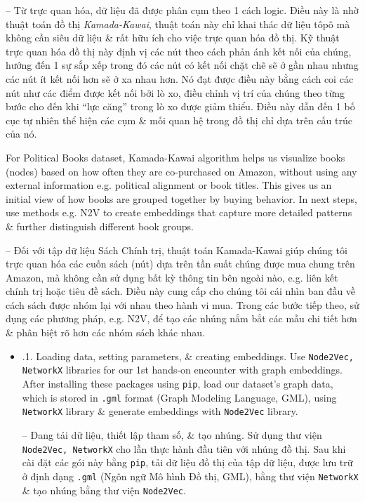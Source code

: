 \documentclass{article}
\begin{document}
\begin{itemize}
\begin{itemize}
        -- Từ trực quan hóa, dữ liệu đã được phân cụm theo 1 cách logic. Điều này là nhờ thuật toán đồ thị {\it Kamada-Kawai}, thuật toán này chỉ khai thác dữ liệu tôpô mà không cần siêu dữ liệu \& rất hữu ích cho việc trực quan hóa đồ thị. Kỹ thuật trực quan hóa đồ thị này định vị các nút theo cách phản ánh kết nối của chúng, hướng đến 1 sự sắp xếp trong đó các nút có kết nối chặt chẽ sẽ ở gần nhau nhưng các nút ít kết nối hơn sẽ ở xa nhau hơn. Nó đạt được điều này bằng cách coi các nút như các điểm được kết nối bởi lò xo, điều chỉnh vị trí của chúng theo từng bước cho đến khi ``lực căng'' trong lò xo được giảm thiểu. Điều này dẫn đến 1 bố cục tự nhiên thể hiện các cụm \& mối quan hệ trong đồ thị chỉ dựa trên cấu trúc của nó.

        For Political Books dataset, Kamada-Kawai algorithm helps us visualize books (nodes) based on how often they are co-purchased on Amazon, without using any external information e.g. political alignment or book titles. This gives us an initial view of how books are grouped together by buying behavior. In next steps, use methods e.g. N2V to create embeddings that capture more detailed patterns \& further distinguish different book groups.

        -- Đối với tập dữ liệu Sách Chính trị, thuật toán Kamada-Kawai giúp chúng tôi trực quan hóa các cuốn sách (nút) dựa trên tần suất chúng được mua chung trên Amazon, mà không cần sử dụng bất kỳ thông tin bên ngoài nào, e.g. liên kết chính trị hoặc tiêu đề sách. Điều này cung cấp cho chúng tôi cái nhìn ban đầu về cách sách được nhóm lại với nhau theo hành vi mua. Trong các bước tiếp theo, sử dụng các phương pháp, e.g. N2V, để tạo các nhúng nắm bắt các mẫu chi tiết hơn \& phân biệt rõ hơn các nhóm sách khác nhau.
       \begin{itemize}
           \item {.1. Loading data, setting parameters, \& creating embeddings.} Use {\tt Node2Vec, NetworkX} libraries for our 1st hands-on encounter with graph embeddings. After installing these packages using {\tt pip}, load our dataset's graph data, which is stored in {\tt.gml} format (Graph Modeling Language, GML), using {\tt NetworkX} library \& generate embeddings with {\tt Node2Vec} library.

           -- {\sf Đang tải dữ liệu, thiết lập tham số, \& tạo nhúng.} Sử dụng thư viện {\tt Node2Vec, NetworkX} cho lần thực hành đầu tiên với nhúng đồ thị. Sau khi cài đặt các gói này bằng {\tt pip}, tải dữ liệu đồ thị của tập dữ liệu, được lưu trữ ở định dạng {\tt.gml} (Ngôn ngữ Mô hình Đồ thị, GML), bằng thư viện {\tt NetworkX} \& tạo nhúng bằng thư viện {\tt Node2Vec}.


\end{itemize}
\end{itemize}
\end{itemize}
\end{document}
